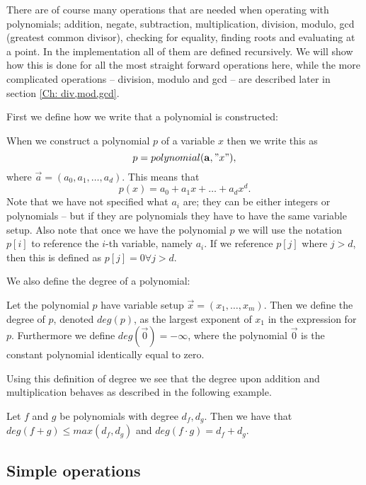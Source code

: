 There are of course many operations that are needed when operating with polynomials; addition, negate, subtraction, multiplication, division, modulo, gcd (greatest common divisor), checking for equality, finding roots and evaluating at a point. In the implementation all of them are defined recursively. We will show how this is done for all the most straight forward operations here, while the more complicated operations -- division, modulo and gcd -- are described later in section \ref{Ch: div,mod,gcd}.

First we define how we write that a polynomial is constructed:
\begin{definition}
  When we construct a polynomial $p$ of a variable $x$ then we write this as
  \begin{equation}
    p = polynomial(\vec{a},"x"),
  \end{equation}
  where $\vec{a}=(a_0,a_1,\ldots,a_d)$. This means that
  \begin{equation}
    p(x) = a_0 + a_1 x + \ldots + a_d x^d.
  \end{equation}
  Note that we have not specified what $a_i$ are; they can be either integers or polynomials -- but if they are polynomials they have to have the same variable setup. Also note that once we have the polynomial $p$ we will use the notation $p[i]$ to reference the $i$-th variable, namely $a_i$. If we reference $p[j]$ where $j>d$, then this is defined as $p[j]=0 \forall j>d$.
\end{definition}

We also define the degree of a polynomial:
\begin{definition}
  Let the polynomial $p$ have variable setup $\vec{x}=(x_1,\ldots,x_m)$. Then we define the degree of $p$, denoted $deg(p)$, as the largest exponent of $x_1$ in the expression for $p$. Furthermore we define $deg(\vec{0})=-\infty$, where the polynomial $\vec{0}$ is the constant polynomial identically equal to zero.
\end{definition}
Using this definition of degree we see that the degree upon addition and multiplication behaves as described in the following example.
\begin{example}
  Let $f$ and $g$ be polynomials with degree $d_f, d_g$. Then we have that $deg(f+g)\leq max(d_f,d_g)$ and $deg(f\cdot g)=d_f+d_g$.
\end{example}

\subsection{Simple operations}\label{Sub: simpleop}


